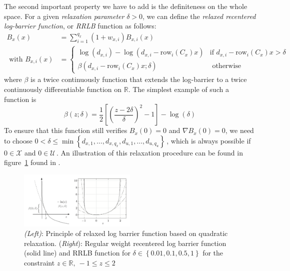 \documentclass[journal]{IEEEtran}
\theoremstyle{definition}
\theoremstyle{remark}
\def\cal#1{\mathcal{#1}}
\def\rm#1{\mathrm{#1}}
\newcommand{\R}{\mathbb{R}}
\begin{document}
The second important property we have to add is the definiteness on the whole space.
For a given \textit{relaxation parameter} $\delta>0$, we can define the \textit{relaxed recentered log-barrier function}, or \textit{RRLB} function as follows:
\begin{align*}
	B_x(x)&=\sum_{i=1}^{q_x}(1+w_{x,i})B_{x,i}(x)\\
	\text{ with }B_{x,i}(x)&=\begin{cases}
		\log(d_{x,i})-\log(d_{x,i}-\rm{row}_i(C_x)x)&\text{if }d_{x,i}-\rm{row}_i(C_x)x>\delta\\
		\beta(d_{x,i}-\rm{row}_i(C_x)x;\delta)&\text{ otherwise}
	\end{cases}
\end{align*}
where $\beta$ is a twice continuously function that extends the log-barrier to a twice continuously differentiable function on $\R$.
The simplest example of such a function is
$$\beta(z;\delta)=\frac{1}{2}\left[ \left( \frac{z-2\delta}{\delta} \right)^2-1 \right]-\log(\delta)$$
To ensure that this function still verifies $B_x(0)=0$ and $\nabla B_x(0)=0$, we need to choose $0<\delta\leq\min\left\{d_{x,1},\ldots,d_{x,q_x},d_{u,1},\ldots,d_{u,q_u}\right\}$\,, which is always possible if $0\in\cal{X}$ and $0\in\cal{U}$\,.
An illustration of this relaxation procedure can be found in figure~\ref{fig:RRLB-functions} found in \cite{rti-diehl}.

\begin{figure}
	\centering
	\includegraphics[width=0.5\textwidth]{images/rrlb-functions.png}
	\caption{\textit{(Left)}: Principle of relaxed log barrier function based on quadratic relaxation. (\textit{Right}): Regular weight recentered log barrier function (solid line) and RRLB function for $\delta\in\left\{ 0.01,0.1,0.5,1 \right\}$ for the constraint $z\in\R,~-1\leq z\leq 2$}
	\label{fig:RRLB-functions}
\end{figure}

\vspace{24pt}
\end{document}

